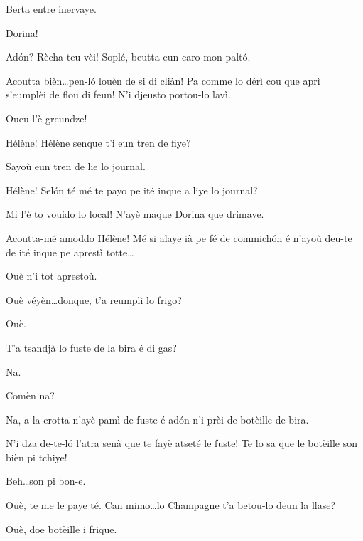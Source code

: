 \begin{drama}
{Berta entre inervaye.}

\Bertaspeaks Dorina!


\Bertaspeaks Ad\'on? Rècha-teu vèi! Soplé, beutta eun caro mon palt\'o.


\Bertaspeaks Acoutta bièn\ldots pen-l\'o louèn de si di cliàn! Pa comme lo dérì cou que aprì s'eumplèi de flou di feun! N'i djeusto portou-lo lavì.


\Dorinaspeaks{} Oueu l'è greundze!

\Bertaspeaks{} Hélène! Hélène senque t'i eun tren de fiye?


\Helenespeaks{} Sayoù eun tren de lie lo journal.

\Bertaspeaks{} Hélène! Sel\'on té mé te payo pe ité inque a liye lo journal?

\Helenespeaks Mi l'è to vouido lo local! N'ayè maque Dorina que drimave.

\Bertaspeaks Acoutta-mé amoddo Hélène! Mé si alaye ià pe fé de commich\'on é n'ayoù deu-te de ité inque pe aprestì totte\ldots

\Helenespeaks Ouè n'i tot aprestoù.

\Bertaspeaks Ouè véyèn\ldots donque, t'a reumplì lo frigo?

\Helenespeaks Ouè.

\Bertaspeaks T'a tsandjà lo fuste de la bira é di gas?

\Helenespeaks Na. 

\Bertaspeaks Comèn na?

\Helenespeaks Na, a la crotta n'ayè pamì de fuste é ad\'on n'i prèi de botèille de bira.

\Bertaspeaks N'i dza de-te-l\'o l'atra senà que te fayè atseté le fuste! Te lo sa que le botèille son bièn pi tchiye!

\Helenespeaks{} Beh\ldots son pi bon-e.

\Bertaspeaks Ouè, te me le paye té. Can mimo\ldots lo Champagne t'a betou-lo deun la llase? 

\Helenespeaks{} Ouè, doe botèille i frique.


\end{drama}
